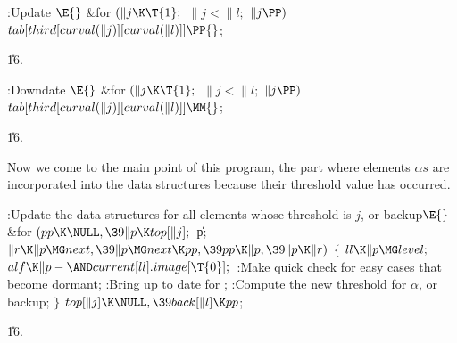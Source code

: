 \B{}:Update \X${}\E{}$\6
\&{for} ${}(\|j\K\T{1};{}$ ${}\|j<\|l;{}$ ${}\|j\PP){}$\1\5
${}\\{tab}[\\{third}[\\{curval}(\|j)][\\{curval}(\|l)]]\PP{}$;\2\par
\U16.\fi

\B{}:Downdate \X${}\E{}$\6
\&{for} ${}(\|j\K\T{1};{}$ ${}\|j<\|l;{}$ ${}\|j\PP){}$\1\5
${}\\{tab}[\\{third}[\\{curval}(\|j)][\\{curval}(\|l)]]\MM{}$;\2\par
\U16.\fi

Now we come to the main point of this program, the part where
elements $\alpha s$ are incorporated into the data structures because
their threshold value has occurred.

\Y\B\4:Update the data structures for all elements whose threshold is $j$,
or backup\X${}\E{}$\6
\&{for} ${}(\\{pp}\K\NULL,\39\|p\K\\{top}[\|j];{}$ \|p; ${}\|r\K\|p\MG\\{next},%
\39\|p\MG\\{next}\K\\{pp},\39\\{pp}\K\|p,\39\|p\K\|r){}$\5
${}\{{}$\1\6
${}\\{ll}\K\|p\MG\\{level};{}$\6
${}\\{alf}\K\|p-{\AND}\\{current}[\\{ll}].\\{image}[\T{0}];{}$\6
:Make quick check for easy cases that become dormant\X;\6
:Bring  up to date for \X;\6
:Compute the new threshold for $\alpha$, or backup\X;\6
\4${}\}{}$\2\6
${}\\{top}[\|j]\K\NULL,\39\\{back}[\|l]\K\\{pp}{}$;\par
\U16.\fi

